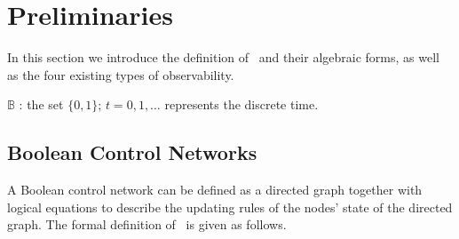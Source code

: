 \section{Preliminaries} 
\label{sec:pre}
In this section we introduce the definition of \BCNs\ and their algebraic forms, as well as the four existing types of observability. 

$\mathbb{B}$ : the set $\{0,1\}$; $t=0,1,\ldots$ represents the discrete time. 

\subsection{Boolean Control Networks}

A Boolean control network can be defined as a directed graph together with logical equations to describe the updating rules of the nodes' state of the directed graph. The formal definition of \BCN\ is given as follows. 

